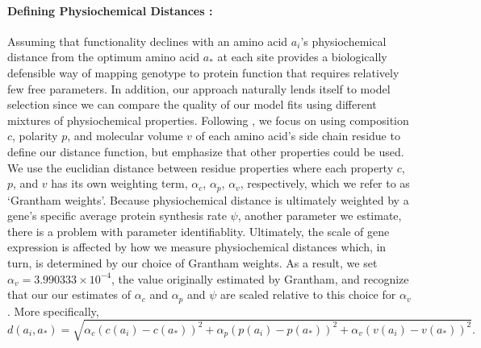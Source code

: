 \documentclass{article}
\newcommand{\alphac}{\ensuremath{\alpha_c}\xspace}
\newcommand{\alphap}{\ensuremath{\alpha_p}\xspace}
\newcommand{\alphav}{\ensuremath{\alpha_v}\xspace}
\newcommand{\aopt}{\ensuremath{a_*}\xspace}
\begin{document}
\paragraph*{Defining Physiochemical Distances :}
Assuming that functionality declines with an amino acid $a_i$'s physiochemical distance from the optimum amino acid \aopt at each site provides a biologically defensible way of mapping genotype to protein function that requires relatively few free parameters.
In addition, our approach naturally lends itself to model selection since we can compare the quality of our model fits using different mixtures of physiochemical properties.
Following \cite{Grantham1974}, we focus on using composition $c$, polarity $p$, and molecular volume $v$ of each amino acid's side chain residue to define our distance function, but emphasize that other properties could be used.
We use the euclidian distance between residue properties where each property $c$, $p$, and $v$ has its own weighting term, $\alphac$, $\alphap$, $\alphav$, respectively, which we refer to as `Grantham weights'.
Because physiochemical distance is ultimately weighted by a gene's specific average protein synthesis rate $\psi$, another parameter we estimate, there is a problem with parameter identifiablity.
Ultimately, the scale of gene expression is affected by how we measure physiochemical distances which, in turn, is determined by our choice of Grantham weights.
As a result, we set $\alphav = 3.990333 \times 10^{-4}$, the value originally estimated by Grantham, and recognize that our our estimates of $\alphac$ and $\alphap$ and $\psi$ are scaled relative to this choice for $\alphav$.
More specifically,
\begin{equation*}
  d(a_i, \aopt) = \sqrt{\alphac \left(c\left(a_i\right) - c\left(\aopt\right)\right)^2 + \alphap \left(p\left(a_i\right) - p\left(\aopt\right)\right)^2 +  \alphav \left(v\left(a_i\right) - v\left(\aopt\right)\right)^2}.
\end{equation*}
\end{document}
